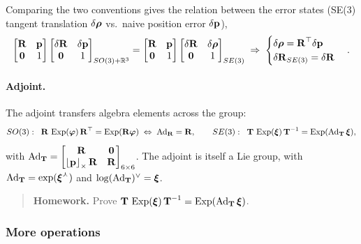 Comparing the two conventions gives the relation between the error states (SE(3) tangent translation $\delta\vect{\rho}$ vs.\ naive position error $\delta\vect{p}$),
\begin{align}
\begin{bmatrix}\vect{R}&\vect{p}\\\vect{0}&1\end{bmatrix}\begin{bmatrix}\delta\vect{R}&\delta\vect{p}\\\vect{0}&1\end{bmatrix}_{SO(3)+\Reals^3}
= \begin{bmatrix}\vect{R}&\vect{p}\\\vect{0}&1\end{bmatrix}\begin{bmatrix}\delta\vect{R}&\delta\vect{\rho}\\\vect{0}&1\end{bmatrix}_{SE(3)}
\;\Rightarrow\;
\begin{cases} \delta\vect{\rho} = \vect{R}\trans\delta\vect{p} \\ \delta\vect{R}_{SE(3)} = \delta\vect{R} \end{cases}.
\end{align}

\paragraph{Adjoint.} The adjoint transfers algebra elements across the group:
\begin{align}
SO(3):\;\; \vect{R}\,\Exp(\vect{\varphi})\,\vect{R}\trans = \Exp(\vect{R}\vect{\varphi}) \;\Leftrightarrow\; \Ad_{\vect{R}} = \vect{R}, \qquad
SE(3):\;\; \vect{T}\,\Exp(\vect{\xi})\,\vect{T}^{-1} = \Exp(\Ad_{\vect{T}}\vect{\xi}),
\end{align}
with $\Ad_{\vect{T}} = \begin{bmatrix}\vect{R} & \vect{0}\\ \skewsym{\vect{p}}\vect{R} & \vect{R}\end{bmatrix}_{6\times6}$. The adjoint is itself a Lie group, with $\Ad_{\vect{T}} = \exp(\vect{\xi}^{\curlywedge})$ and $\log(\Ad_{\vect{T}})^{\vee} = \vect{\xi}$.
\begin{quote}
\textbf{Homework.} Prove $\vect{T}\,\Exp(\vect{\xi})\,\vect{T}^{-1} = \Exp(\Ad_{\vect{T}}\vect{\xi})$.
\end{quote}

\subsubsection*{More operations}
